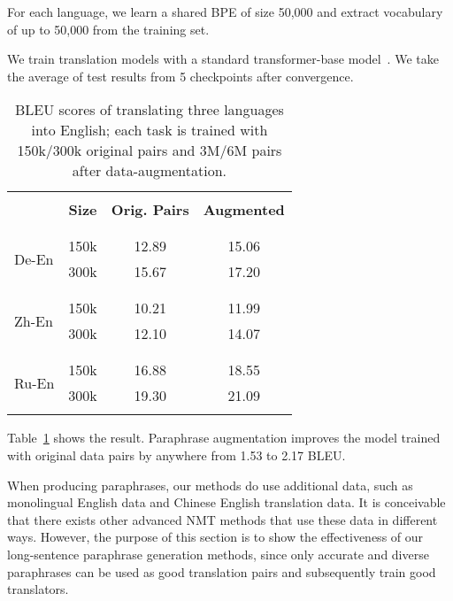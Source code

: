 For each language, we learn a shared BPE of size 50,000 
and extract vocabulary of up to 
50,000 from the training set.

We train translation models with a standard 
transformer-base model~\cite{vaswani2017attention}. 
We take the average of test results from 5 checkpoints after convergence.

\begin{table}
\centering
\small
\begin{tabular}{p{1cm}ccc}
\hline
\\ [-1.8ex]
& \textbf{Size} & \textbf{Orig. Pairs} & \textbf{Augmented} \\
\\ [-1.8ex]
\cline{2-4} 
\\ [-1.8ex]
\multirow{2}{1cm}{De-En} & 150k & 12.89 & 15.06 \\
& 300k & 15.67 & 17.20 \\
\\ [-1.8ex]
\hline
\\ [-1.8ex]
\multirow{2}{1cm}{Zh-En} & 150k & 10.21 & 11.99 \\
& 300k & 12.10 & 14.07 \\
\\ [-1.8ex]
\hline
\\ [-1.8ex]
\multirow{2}{1cm}{Ru-En} & 150k & 16.88 & 18.55 \\
& 300k & 19.30 & 21.09 \\
\\ [-1.8ex]
\hline
\end{tabular}
\caption{\label{tab:augment}
BLEU scores of translating three languages into English; 
each task is trained with 150k/300k original pairs 
and 3M/6M pairs after data-augmentation.}
\end{table}

Table~\ref{tab:augment} shows the result. 
Paraphrase augmentation improves the model trained with original data pairs 
by anywhere from 1.53 to 2.17 BLEU. 

When producing paraphrases, our methods do use additional data, 
such as monolingual English data and Chinese English translation data. 
It is conceivable that there exists other advanced NMT methods that use
these data in different ways. However, the purpose of this section is to 
show the effectiveness of our long-sentence paraphrase 
generation methods, since only accurate and diverse paraphrases 
can be used as good translation pairs and subsequently train good translators.

